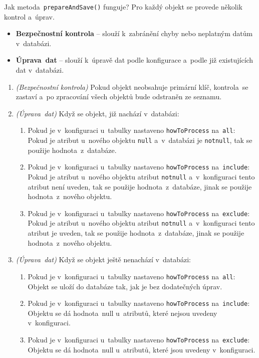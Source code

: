 Jak metoda~\texttt{prepareAndSave()} funguje?
Pro každý objekt se provede několik kontrol a~úprav.

\begin{itemize}
    \item \textbf{Bezpečnostní kontrola} -- slouží k~zabránění chyby nebo neplatným datům v~databázi.
    \item \textbf{Úprava~dat} -- slouží k~úpravě dat podle konfigurace a~podle již existujících dat v~databázi.
\end{itemize}

\begin{enumerate}
    \item \textit{(Bezpečnostní kontrola)} Pokud objekt neobsahuje primární klíč, kontrola~se zastaví a~po 
    zpracování všech objektů bude odstraněn ze seznamu.
    
    \item \textit{(Úprava~dat)} Když se objekt, již nachází v~databázi:
    \begin{enumerate}
        \item Pokud je v~konfiguraci u~tabulky nastaveno \texttt{howToProcess} na~\texttt{all}:
        Pokud je atribut u~nového objektu \texttt{null} a~v~databázi je \texttt{notnull}, tak se použije hodnota~z~databáze.
        \item Pokud je v~konfiguraci u~tabulky nastaveno \texttt{howToProcess} na~\texttt{include}:
        Pokud je atribut u~nového objektu atribut \texttt{notnull} a~v~konfiguraci tento atribut není uveden, tak se použije hodnota~z~databáze,
        jinak se použije hodnota~z~nového objektu.
        \item Pokud je v~konfiguraci u~tabulky nastaveno \texttt{howToProcess} na~\texttt{exclude}:
        Pokud je atribut u~nového objektu atribut \texttt{notnull} a~v~konfiguraci tento atribut je uveden, tak se použije hodnota~z~databáze,
        jinak se použije hodnota~z~nového objektu.
    \end{enumerate}

    \item \textit{(Úprava~dat)} Když se objekt ještě nenachází v~databázi:
    \begin{enumerate}
        \item Pokud je v~konfiguraci u~tabulky nastaveno \texttt{howToProcess} na~\texttt{all}:
        Objekt se uloží do databáze tak, jak je bez dodatečných úprav.
        \item Pokud je v~konfiguraci u~tabulky nastaveno \texttt{howToProcess} na~\texttt{include}:
        Objektu se dá hodnota~null u~atributů, které nejsou uvedeny v~konfiguraci.
        \item Pokud je v~konfiguraci u~tabulky nastaveno \texttt{howToProcess} na~\texttt{exclude}:
        Objektu se dá hodnota~null u~atributů, které jsou uvedeny v~konfiguraci.
    \end{enumerate}


\end{enumerate}

